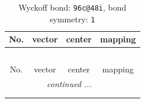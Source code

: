 \documentclass[fleqn,8pt]{jsarticle}
\begin{document}
\renewcommand{\arraystretch}{1.2}
\begin{longtable}{cccc}
\caption{Wyckoff bond: {\tt 96c@48i}, bond symmetry: {\tt 1}}
 \\
 \hline \hline
No. & vector & center & mapping \\ \hline \endfirsthead

\multicolumn{3}{l}{\tablename\ \thetable{}} \\
 \hline \hline
No. & vector & center & mapping \\ \hline \endhead

 \hline \hline
\multicolumn{3}{r}{\footnotesize\it continued ...} \\ \endfoot

 \hline \hline
\multicolumn{3}{r}{} \\ \endlastfoot


\end{longtable}
\end{document}
